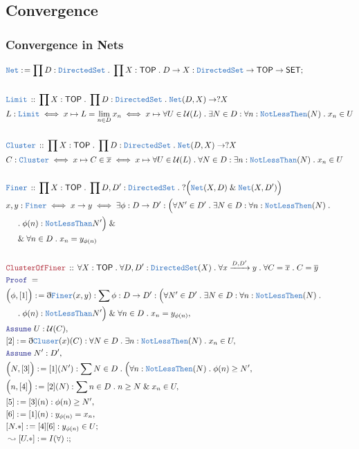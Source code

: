 \documentclass[12pt]{scrartcl}
\newcommand{\TYPE}[1]{\textcolor{NavyBlue}{\mathtt{#1}}}
\newcommand{\LOGIC}[1]{\textcolor{Blue}{\mathtt{#1}}}
\newcommand{\THM}[1]{\textcolor{Maroon}{\mathtt{#1}}}
\renewcommand{\.}{\; . \;}
\newcommand{\de}{: \kern 0.1pc =}
\newcommand{\Theorem}[2]{& \THM{#1} \, :: \, #2 \\ & \Proof = \\ }
\newcommand{\DeclareType}[2]{& \TYPE{#1} \, :: \, #2 \\}
\newcommand{\DefineNamedType}[4]{& #1 : \TYPE{#2} \iff #3 \iff #4 \\}
\newcommand{\NewLine}{\\ & \kern 1pc}
\newcommand{\Page}[1]{ \begin{align*} #1 \end{align*}   }
\newcommand{ \bd }{ \ByDef }
\renewcommand{\And}{\; \& \;}
\newcommand{\Arrow}{\xrightarrow}
\newcommand{\Say}[3]{& #1 \de #2 : #3, \\}
\newcommand{\Conclude}[3]{& #1 \de #2 : #3; \\}
\newcommand{\DeriveConclude}[3]{& \leadsto #1 \de #2 : #3 ; \\}
\newcommand{\Assume}[2]{& \LOGIC{Assume} \; #1 : #2, \\}
\newcommand{\ByDef}{\eth}
\newcommand{\Proof}{\LOGIC{Proof} \; }
\newcommand{\SET}{\mathsf{SET}}
\newcommand{\TOP}{\mathsf{TOP}}
\renewcommand{\U}{\mathcal{U}}
\begin{document}
\subsection{Convergence}
\subsubsection{Convergence in Nets}
\Page{
	\Conclude{\TYPE{Net}}{\prod D : \TYPE{DirectedSet} \. \prod X : \TOP \. D \to X }
	{
		\TYPE{DirectedSet} \to \TOP \to \SET
	}
	\\
	\DeclareType{Limit}{ \prod X : \TOP \. \prod D : \TYPE{DirectedSet} \. \TYPE{Net}(D,X) \to ?X}
	\DefineNamedType{L}{Limit}{ x \mapsto  L = \lim_{n \in D} x_n}
	{
		x \mapsto
		\forall U \in \U(L) \.
		\exists N \in D : 
		\forall n : \TYPE{NotLessThen}(N) \.
		x_n \in U
	}
	\\
	\DeclareType{Cluster}{ \prod X : \TOP \. \prod D : \TYPE{DirectedSet} \. \TYPE{Net}(D,X) \to ?X}
	\DefineNamedType{C}{Cluster}{ x \mapsto  C \in \overline{x}}
	{
		x \mapsto
		\forall U \in \U(L) \.
		\forall N \in D : 
		\exists n : \TYPE{NotLessThan}(N) \.
		x_n \in U
	}
	\\
	\DeclareType{Finer}{
		\prod X : \TOP \. 
		\prod D,D' : \TYPE{DirectedSet}  \. 
		?\Big( \TYPE{Net}(X,D) \And \TYPE{Net}(X,D') \Big)
	}
	\DefineNamedType{x,y}{Finer}{x \to y}
	{
		\exists \phi : D \to D' : 
		\Big(\forall N' \in D' \. \exists N \in D : \forall n : \TYPE{NotLessThen}(N) \. \NewLine \.
			\phi(n) : \TYPE{NotLessThan} N'\Big) \And \NewLine \And 
		\forall n \in D \.  x_n = y_{\phi(n)} 
	}
	\\
	\Theorem{ClusterOfFiner}
	{
		\forall X : \TOP \.
		\forall D,D' : \TYPE{DirectedSet}(X) \.
		\forall  x \Arrow{D,D'} y \.
		\forall C = \overline{x} \.
		C = \overline{y}
	}
	\Say{\Big(\phi, [1] \Big)}{ \bd \TYPE{Finer}(x,y) }
	{
		\sum \phi : D \to D' : 
		\Big(\forall N' \in D' \. \exists N \in D : \forall n : \TYPE{NotLessThen}(N) \. \NewLine \.
			\phi(n) : \TYPE{NotLessThan} N'\Big) \And 
		\forall n \in D \.  x_n = y_{\phi(n)} 
	}
	\Assume{U}{\U(C)}
	\Say{[2]}{\bd \TYPE{Cluser}(x)(C) }
	{
		\forall N \in D \. \exists n : \TYPE{NotLessThen}(N) \. x_n \in U
	}
	\Assume{N'}{D'}
	\Say{\Big(N,[3]\Big)}{[1](N')}{
		\sum N \in D \.  \Big( 
		\forall n : \TYPE{NotLessThen}(N) \. 
		\phi(n) \ge N'
	}
	\Say{\Big(n,[4]\Big)}{[2](N)}
	{
		\sum n \in D \. n \ge N  \And x_n \in U
	}
	\Say{[5]}{[3](n)}{\phi(n) \ge N'}
	\Say{[6]}{[1](n)}{  y_{\phi(n)} = x_n   }
	\Conclude{[N.*]}{[4][6]}{  y_{\phi(n)} \in U  }
	\DeriveConclude{[U.*]}{ I(\forall) }{ 
}}
\end{document}
